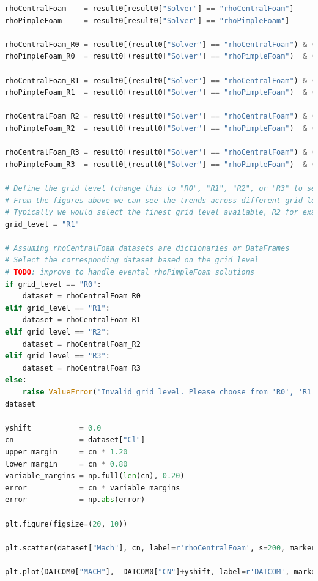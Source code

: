 \documentclass[12pt]{article}
\begin{document}
\begin{lstlisting}[language=Python, caption=Python script used to post-process numerical solutions. To report bugs email to: lorenzo.campoli@gspace.com, label=lst:pp]
rhoCentralFoam    = result0[result0["Solver"] == "rhoCentralFoam"]
rhoPimpleFoam     = result0[result0["Solver"] == "rhoPimpleFoam"]

rhoCentralFoam_R0 = result0[(result0["Solver"] == "rhoCentralFoam") & (result0["GridLevel"] == "R0")]
rhoPimpleFoam_R0  = result0[(result0["Solver"] == "rhoPimpleFoam")  & (result0["GridLevel"] == "R0")]

rhoCentralFoam_R1 = result0[(result0["Solver"] == "rhoCentralFoam") & (result0["GridLevel"] == "R1")]
rhoPimpleFoam_R1  = result0[(result0["Solver"] == "rhoPimpleFoam")  & (result0["GridLevel"] == "R1")]

rhoCentralFoam_R2 = result0[(result0["Solver"] == "rhoCentralFoam") & (result0["GridLevel"] == "R2")]
rhoPimpleFoam_R2  = result0[(result0["Solver"] == "rhoPimpleFoam")  & (result0["GridLevel"] == "R2")]

rhoCentralFoam_R3 = result0[(result0["Solver"] == "rhoCentralFoam") & (result0["GridLevel"] == "R3")]
rhoPimpleFoam_R3  = result0[(result0["Solver"] == "rhoPimpleFoam")  & (result0["GridLevel"] == "R3")]

# Define the grid level (change this to "R0", "R1", "R2", or "R3" to select the dataset)
# From the figures above we can see the trends across different grid levels
# Typically we would select the finest grid level available, R2 for example
grid_level = "R1" 

# Assuming rhoCentralFoam datasets are dictionaries or DataFrames
# Select the corresponding dataset based on the grid level
# TODO: improve to handle evental rhoPimpleFoam solutions
if grid_level == "R0":
    dataset = rhoCentralFoam_R0
elif grid_level == "R1":
    dataset = rhoCentralFoam_R1
elif grid_level == "R2":
    dataset = rhoCentralFoam_R2
elif grid_level == "R3":
    dataset = rhoCentralFoam_R3
else:
    raise ValueError("Invalid grid level. Please choose from 'R0', 'R1', 'R2', or 'R3'.")
dataset

yshift           = 0.0
cn               = dataset["Cl"] 
upper_margin     = cn * 1.20 
lower_margin     = cn * 0.80  
variable_margins = np.full(len(cn), 0.20)
error            = cn * variable_margins 
error            = np.abs(error)        

plt.figure(figsize=(20, 10))

plt.scatter(dataset["Mach"], cn, label=r'rhoCentralFoam', s=200, marker='o', color='b', linestyle='solid')

plt.plot(DATCOM0["MACH"], -DATCOM0["CN"]+yshift, label=r'DATCOM', marker='p', linestyle=':', color='gray')


\end{lstlisting}
\end{document}
